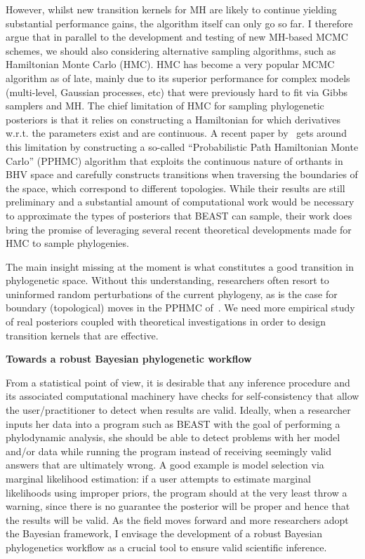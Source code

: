 However, whilst new transition kernels for MH are likely to continue yielding substantial performance gains, the algorithm itself can only go so far.
I therefore argue that in parallel to the development and testing of new MH-based MCMC schemes, we should also considering alternative sampling algorithms, such as Hamiltonian Monte Carlo (HMC).
HMC has become a very popular MCMC algorithm as of late, mainly due to its superior performance for complex models (multi-level, Gaussian processes, etc) that were previously hard to fit via Gibbs samplers and MH.
The chief limitation of HMC for sampling phylogenetic posteriors is that it relies on constructing a Hamiltonian for which derivatives w.r.t. the parameters exist and are continuous.
A recent paper by~\cite{Dinh2017} gets around this limitation by constructing a so-called ``Probabilistic Path Hamiltonian Monte Carlo'' (PPHMC) algorithm that exploits the continuous nature of orthants in BHV space and carefully constructs transitions when traversing the boundaries of the space, which correspond to different topologies.
While their results are still preliminary and a substantial amount of computational work would be necessary to approximate the types of posteriors that BEAST can sample, their work does bring the promise of leveraging several recent theoretical developments made for HMC to sample phylogenies.

The main insight missing at the moment is what constitutes a good transition in phylogenetic space.
Without this understanding, researchers often resort to uninformed random perturbations of the current phylogeny, as is the case for boundary (topological) moves in the PPHMC of~\cite{Dinh2017}.
We need more empirical study of real posteriors coupled with theoretical investigations in order to design transition kernels that are effective.

\textbf{Towards a robust Bayesian phylogenetic workflow}

From a statistical point of view, it is desirable that any inference procedure and its associated computational machinery have checks for self-consistency that allow the user/practitioner to detect when results are valid.
Ideally, when a researcher inputs her data into a program such as BEAST with the goal of performing a phylodynamic analysis, she should be able to detect problems with her model and/or data while running the program instead of receiving seemingly valid answers that are ultimately wrong.
A good example is model selection via marginal likelihood  estimation: if a user attempts to estimate marginal likelihoods using improper priors, the program should at the very least throw a warning, since there is no guarantee the posterior will be proper and hence that the results will be valid.
As the field moves forward and more researchers adopt the Bayesian framework, I envisage the development of a robust Bayesian phylogenetics workflow as a crucial tool to ensure valid scientific inference.

